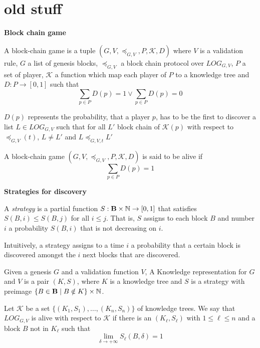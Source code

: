 \section{old stuff}

\medskip
\noindent
\textbf{Block chain game}

\begin{mydef}
A block-chain game is a tuple $(G,V,\preceq_{G,V},P,\mathcal K,D)$ where $V$ is a validation rule, $G$ a list of genesis blocks, $\preceq_{G,V}$ a block chain protocol over $LOG_{G,V}$, $P$ a set of player, $\mathcal K$ a function which map each player of $P$ to a knowledge tree and $D : P \rightarrow [0, 1] $ such that $$\sum_{p\in P} D(p) = 1 \lor \sum_{p\in P} D(p) = 0$$ 
\end{mydef}
$D(p)$ represents the probability, that a player $p$, has to be the first to discover a list $L \in LOG_{G,V}$ such that for all $L'$ block chain of $\mathcal K (p)$ with respect to $\preceq_{G,V}(t)$, $L \neq L'$ and $L \preceq_{G,V,t} L'$

\begin{mydef}
	A block-chain game $(G,V,\preceq_{G,V},P,\mathcal K,D)$ is said to be alive if $$\sum_{p\in P} D(p) = 1$$
\end{mydef}

\medskip
\noindent
\textbf{Strategies for discovery}

\begin{mydef}
	A \emph{strategy} is a partial function $S: \text{\bf B} \times \mathbb{N} \rightarrow [0,1]$ that 
	satisfies $S(B,i) \leq S(B,j)$ for all $i \leq j$. That is, $S$ assigns 
	to each block $B$ and number $i$ a probability $S(B,i)$ that is not decreasing on $i$. 
\end{mydef}

Intuitively, a strategy assigns to a time $i$ a probability that a certain block is discovered amongst the 
$i$ next blocks that are discovered. 

\begin{mydef}
	Given a genesis $G$ and a validation function $V$, 
	A Knowledge representation for $G$ and $V$ is a pair $(K,S)$, where $K$ is a knowledge tree and 
	$S$ is a strategy with preimage $\{B \in \text{\bf B} \mid B \notin K\} \times \mathbb N$. 
\end{mydef}

Let $\mathcal K$ be a set $\{(K_1,S_1),\dots,(K_n,S_n)\}$ of knowledge trees. 
We say that $LOG_{G,V}$ is alive with respect to $\mathcal K$ if there is an $(K_\ell,S_\ell)$ with $1 \leq \ell \leq n$ 
and a block $B$ not in $K_\ell$ such that 
$$\lim\limits_{\delta\rightarrow +\infty}S_\ell(B,\delta) = 1$$

